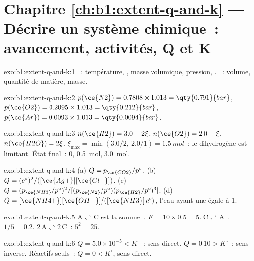 \section*{Chapitre \ref{ch:b1:extent-q-and-k} --- Décrire un système chimique~: avancement, activités, Q et K}

\begin{solution}{exo:b1:extent-q-and-k:1}
~: température, , masse volumique,
pression, . ~: volume, quantité de matière,
masse.
\end{solution}

\begin{solution}{exo:b1:extent-q-and-k:2}
$p(\ce{N2}) = 0.7808 \times 1.013 = \qty{0.791}{bar}$, $p(\ce{O2}) =
0.2095 \times 1.013 = \qty{0.212}{bar}$, $p(\ce{Ar}) = 0.0093 \times 1.013
= \qty{0.0094}{bar}$.
\end{solution}

\begin{solution}{exo:b1:extent-q-and-k:3}
$n(\ce{H2}) = 3.0 - 2\xi$, $n(\ce{O2}) = 2.0 - \xi$, $n(\ce{H2O}) =
2\xi$. $\xi_{\max} = \min(3.0/2,\ 2.0/1) = \qty{1.5}{mol}$~: le
dihydrogène est limitant. État final~:  0, 
\qty{0.5}{mol}, 
\qty{3.0}{mol}.
\end{solution}

\begin{solution}{exo:b1:extent-q-and-k:4}
(a) $Q = p_{\ce{CO2}}/p^\circ$. (b) $Q = (c^\circ)^2/([\ce{Ag+}][\ce{Cl-}])$.
(c) $Q = (p_{\ce{NH3}}/p^\circ)^2/[(p_{\ce{N2}}/p^\circ)(p_{\ce{H2}}/p^\circ)^3]$.
(d) $Q = [\ce{NH4+}][\ce{OH-}]/([\ce{NH3}]\,c^\circ)$, l'eau ayant une
 égale à 1.
\end{solution}

\begin{solution}{exo:b1:extent-q-and-k:5}
$\mathrm{A \rightleftharpoons C}$ est la somme~: $K = 10 \times 0.5 = 5$. $\mathrm{C \rightleftharpoons A}$~: $1/5 =
0.2$. $\mathrm{2\,A \rightleftharpoons 2\,C}$~: $5^2 = 25$.
\end{solution}

\begin{solution}{exo:b1:extent-q-and-k:6}
$Q = 5.0 \times 10^{-5} < K^\circ$~: sens direct. $Q = 0.10 > K^\circ$~:
sens inverse. Réactifs seuls~: $Q = 0 < K^\circ$, sens direct.
\end{solution}


